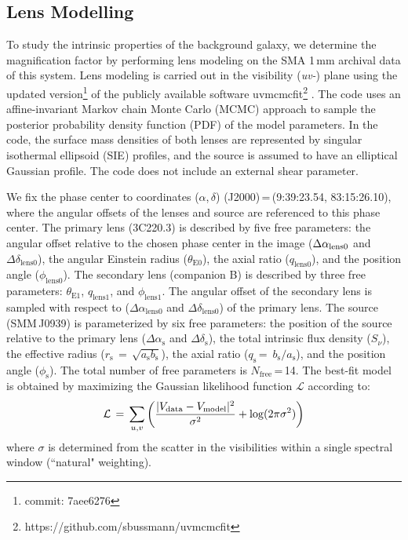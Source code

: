 \documentclass[twocolumn,apj,numberedappendix]{emulateapj}
\begin{document}
\subsection{Lens Modelling} \label{sec:Lens} 
To study the intrinsic properties of the background galaxy, we determine the magnification factor by performing
lens modeling on the SMA 1\,mm archival data of this system. Lens modeling is carried out in the visibility
({\it uv-}) plane using the updated version\footnote{commit: 7aee6276} of the publicly available software {\sc uvmcmcfit}\footnote{https://github.com/sbussmann/uvmcmcfit}
\citep{Bussmann15a}. The code uses an affine-invariant Markov chain Monte Carlo (MCMC) approach to sample the posterior
probability density function (PDF) of the model parameters. In the code, the surface mass densities of both
lenses are represented by singular isothermal ellipsoid (SIE) profiles, and the source is assumed to have an
elliptical Gaussian profile. The code does not include an external shear parameter.

We fix the phase center to coordinates ($\alpha$,\,$\delta$)\,\,(J2000)\,=\,(9:39:23.54,\,\,83:15:26.10), where the
angular offsets of the lenses and source are referenced to this phase center. The primary lens (3C220.3) is
described by five free parameters: the angular offset relative to
the chosen phase center in the image ($\Delta \alpha_{\rm
lens0}$ and $\Delta \delta_\textrm{lens0}$), the angular Einstein radius ($\theta_\textrm{E0}$), the
axial ratio ($q_\textrm{lens0}$), and the position angle ($\phi_\textrm{lens0}$). The secondary lens (companion B) is
described by three free parameters: $\theta_\textrm{E1}$, $q_\textrm{lens1}$, and $\phi_\textrm{lens1}$. The angular offset
of the secondary
lens is sampled with respect to ($\Delta \alpha_\textrm{lens0}$ and $\Delta \delta_\textrm{lens0}$) of
the primary lens.
The source (SMM\,J0939) is parameterized by
six free parameters: the position of the source relative to the
primary lens ($\Delta \alpha_\textrm{s}$ and $\Delta
\delta_\textrm{s}$), the total intrinsic flux density ($S_\nu$), the
effective radius ($r_\textrm{s}\,=\,\sqrt{a_\textrm{s} b_\textrm{s}}$), the axial
ratio ($q_\textrm{s}$\,=\, $b_\textrm{s}/a_\textrm{s}$), and the position angle
($\phi_\textrm{s}$).
The total number of free parameters is $N_\textrm{free}$\,=\,14. The best-fit model is obtained by maximizing the
Gaussian likelihood function $ \mathcal{L} $ according to:
\begin{equation}
    \mathcal{L}\,=\,\sum_{u, v}\left( \frac{|V_\textrm{data} - V_{\rm
    model}|^2}{\sigma^2} + {\rm log}(2 \pi \sigma^2) \right)
\end{equation}
\noindent where $\sigma$ is determined from the scatter in the visibilities within a
single spectral window (``natural" weighting).
\end{document}
